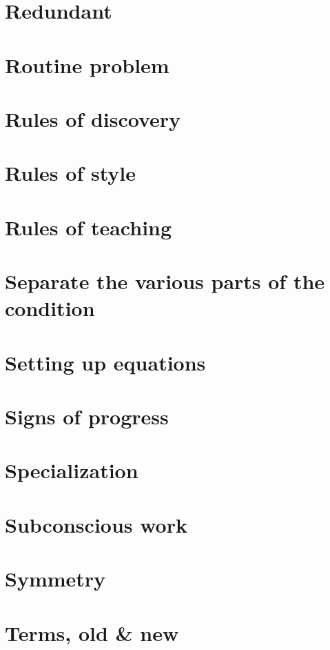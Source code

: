 \documentclass[oneside]{book}
\numberwithin{equation}{section}
\begin{document}
\section{Redundant}

\section{Routine problem}

\section{Rules of discovery}

\section{Rules of style}

\section{Rules of teaching}

\section{Separate the various parts of the condition}

\section{Setting up equations}

\section{Signs of progress}

\section{Specialization}

\section{Subconscious work}

\section{Symmetry}

\section{Terms, old \& new}
\end{document}
